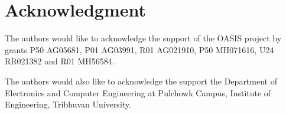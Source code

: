 \documentclass[journal,twoside]{IEEEtran}
\begin{document}



\section*{Acknowledgment}
The authors would like to acknowledge the support of the OASIS project by grants P50 AG05681, P01 AG03991, R01 AG021910, P50 MH071616, U24 RR021382 and R01 MH56584.
\par The authors would also like to acknowledge the support the Department of Electronics and Computer Engineering at Pulchowk Campus, Institute of Engineering, Tribhuvan University.



\ifCLASSOPTIONcaptionsoff
  \newpage
\fi



\end{document}
